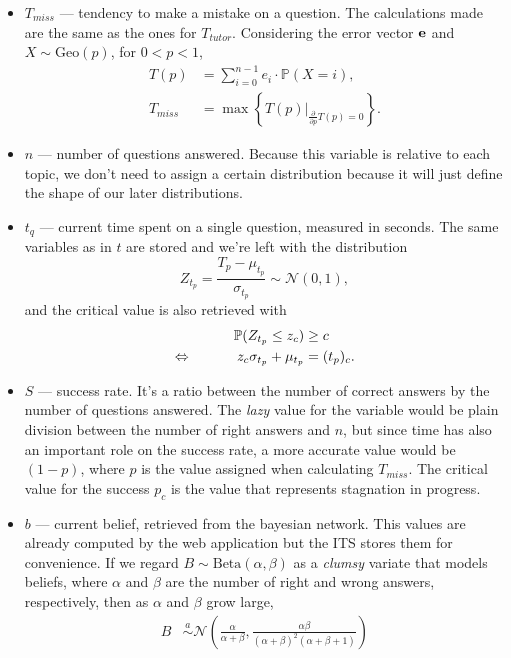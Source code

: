 \documentclass{article}
\newcommand{\0}{\mathbbold{0}}
\newcommand{\1}{\mathds{1}}
\newcommand{\Beta}[2]{\text{Beta}\!\left(#1,#2\right)}
\newcommand{\LRA}{\Leftrightarrow\mkern40mu}
\begin{document}
\begin{itemize} 
    \item $T_\mathit{miss}$ — tendency to make a mistake on a question. The calculations made are the same as the ones for $T_\mathit{tutor}$. Considering the error vector ${\bf e}$ and $X \sim \text{Geo}(p)$, for $0<p<1$,
    \begin{align*}
        T(p) &= \sum_{i=0}^{n-1} e_i \cdot \mathbb{P}(X = i), \\
        T_\mathit{miss} &= \max\left\{\left.T(p)\right|_{\frac{\partial}{\partial p}T(p) = 0}\right\}.
    \end{align*}
    \item $n$ — number of questions answered. Because this variable is relative to each topic, we don't need to assign a certain distribution because it will just define the shape of our later distributions.
    \item $t_q$ — current time spent on a single question, measured in seconds. The same variables as in $t$ are stored and we're left with the distribution
    $$ Z_{t_p} = \frac{T_p-\mu_{t_p}}{\sigma_{t_p}} \sim \mathcal{N}(0,1), $$
    and the critical value is also retrieved with
    \begin{alignat*}{2}
        && \mathbb{P}(Z_{t_p} \le z_c) &\ge c \\
        \LRA && z_c\sigma_{t_p} + \mu_{t_p} &= (t_p)_c.
    \end{alignat*}
    \item $S$ — success rate. It's a ratio between the number of correct answers by the number of questions answered. The \textsl{lazy} value for the variable would be plain division between the number of right answers and $n$, but since time has also an important role on the success rate, a more accurate value would be $(1-p)$, where $p$ is the value assigned when calculating $T_\mathit{miss}$. The critical value for the success $p_c$ is the value that represents stagnation in progress.
    \item $b$ — current belief, retrieved from the bayesian network. This values are already computed by the web application but the ITS stores them for convenience. If we regard $B \sim \Beta{\alpha}{\beta}$ as a \textsl{clumsy} variate that models beliefs, where $\alpha$ and $\beta$ are the number of right and wrong answers, respectively, then as $\alpha$ and $\beta$ grow large,
    \begin{align*}
        B &\overset{a}{\sim} \mathcal{N}\!\left(\frac{\alpha}{\alpha+\beta}, \frac{\alpha\beta}{(\alpha+\beta)^2(\alpha+\beta+1)}\right) \\

\end{align*}
\end{itemize}
\end{document}
